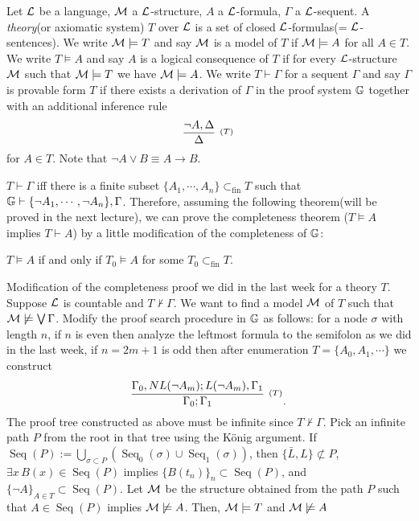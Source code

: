 \documentclass{../../../small}
\DeclareMathOperator{\Seq}{Seq}
\begin{document}
\begin{defn*}
Let $\mathcal{L}$ be a language, $\mathcal{M}$ a $\mathcal{L}$-structure, $A$ a $\mathcal{L}$-formula, $\Gamma$ a $\mathcal{L}$-sequent.
A \emph{theory}(or axiomatic system) $T$ over $\mathcal{L}$ is a set of closed $\mathcal{L}$-formulas(= $\mathcal{L}$-sentences).
We write $\mathcal{M}\models T$ and say $\mathcal{M}$ is a model of $T$ if $\mathcal{M}\models A$ for all $A\in T$.
We write $T\models A$ and say $A$ is a logical consequence of $T$ if for every $\mathcal{L}$-structure $\mathcal{M}$ such that $\mathcal{M}\models T$ we have $\mathcal{M}\models A$.
We write $T\vdash\Gamma$ for a sequent $\Gamma$ and say $\Gamma$ is provable form $T$ if there exists a derivation of $\Gamma$ in the proof system $\mathbb{G}$ together with an additional inference rule
\[\infer[^{(T)}]{\Delta}{\neg A,\Delta}\]
for $A\in T$.
Note that $\neg A\vee B\equiv A\to B$.
\end{defn*}
\begin{rmk*}
$T\vdash\Gamma$ iff there is a finite subset $\{A_1,\cdots,A_n\}\subset_{\mathrm{fin}}T$ such that $\mathbb{G}\vdash\{\neg A_1,\cdots,\neg A_n\},\Gamma$.
Therefore, assuming the following theorem(will be proved in the next lecture), we can prove the completeness theorem ($T\models A$ implies $T\vdash A$) by a little modification of the completeness of $\mathbb{G}$:
\end{rmk*}
\begin{thm*}[Compactness]
$T\models A$ if and only if $T_0\models A$ for some $T_0\subset_{\mathrm{fin}}T$.
\end{thm*}


Modification of the completeness proof we did in the last week for a theory $T$.
Suppose $\mathcal{L}$ is countable and $T\not\vdash\Gamma$.
We want to find a model $\mathcal{M}$ of $T$ such that $\mathcal{M}\not\models \bigvee\Gamma$.
Modify the proof search procedure in $\mathbb{G}$ as follows:
for a node $\sigma$ with length $n$, if $n$ is even then analyze the leftmost formula to the semifolon as we did in the last week, if $n=2m+1$ is odd then after enumeration $T=\{A_0,A_1,\cdots\}$ we construct
\[\infer[^{(T)}]{\Gamma_0;\Gamma_1}{\Gamma_0,NL(\neg A_m);L(\neg A_m),\Gamma_1}.\]
The proof tree constructed as above must be infinite since $T\not\vdash\Gamma$.
Pick an infinite path $P$ from the root in that tree using the K\"onig argument.
If $\Seq(P):=\bigcup_{\sigma\subset P}(\Seq_0(\sigma)\cup\Seq_1(\sigma))$, then $\{\bar L,L\}\not\subset P$, $\exists x\,B(x)\in\Seq(P)$ implies $\{B(t_n)\}_n\subset\Seq(P)$, and $\{\neg A\}_{A\in T}\subset\Seq(P)$.
Let $\mathcal{M}$ be the structure obtained from the path $P$ such that $A\in\Seq(P)$ implies $\mathcal{M}\not\models A$.
Then, $\mathcal{M}\models T$ and $\mathcal{M}\not\models A$
\end{document}
